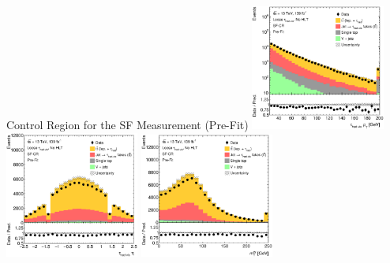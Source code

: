 \documentclass[11pt, xcolor={dvipsnames}, aspectratio=169]{beamer}
\begin{document}
\begin{frame}{Control Region for the SF Measurement (Pre-Fit)}
  \includegraphics[width=0.33\textwidth]{ttbarSF/prefit_sfcr/PTVR}%
  \includegraphics[width=0.33\textwidth]{ttbarSF/prefit_sfcr/ETAVR}%
  \includegraphics[width=0.33\textwidth]{ttbarSF/prefit_sfcr/MTWVR}
\end{frame}

\end{document}
